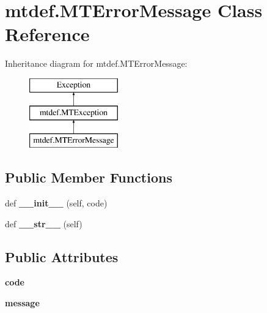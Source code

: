 \hypertarget{classmtdef_1_1MTErrorMessage}{}\section{mtdef.\+M\+T\+Error\+Message Class Reference}
\label{classmtdef_1_1MTErrorMessage}
Inheritance diagram for mtdef.\+M\+T\+Error\+Message\+:\begin{figure}[H]
\begin{center}
\leavevmode
\includegraphics[height=3.000000cm]{classmtdef_1_1MTErrorMessage}
\end{center}
\end{figure}
\subsection*{Public Member Functions}
\begin{DoxyCompactItemize}
\item 
\mbox{\label{classmtdef_1_1MTErrorMessage_ae64bba7a4863363c760725b93dc0ae80}} 
def {\bfseries \+\_\+\+\_\+init\+\_\+\+\_\+} (self, code)
\item 
\mbox{\label{classmtdef_1_1MTErrorMessage_a6b2ec6a3fc0618769ba588b72bbf2095}} 
def {\bfseries \+\_\+\+\_\+str\+\_\+\+\_\+} (self)
\end{DoxyCompactItemize}
\subsection*{Public Attributes}
\begin{DoxyCompactItemize}
\item 
\mbox{\label{classmtdef_1_1MTErrorMessage_a09e96893fc730ac976b9ee2ac808b003}} 
{\bfseries code}
\item 
\mbox{\label{classmtdef_1_1MTErrorMessage_acd7e05bad351f6a79d3593d580790e2e}} 
{\bfseries message}
\end{DoxyCompactItemize}
